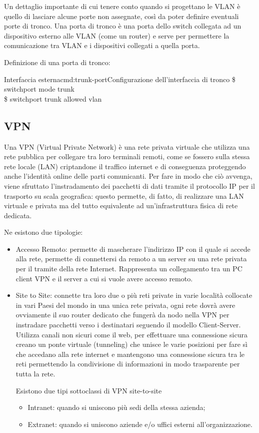 Un dettaglio importante di cui tenere conto quando si progettano le VLAN è quello di lasciare alcune porte non assegnate, così da poter definire eventuali porte di tronco. Una porta di tronco è una porta dello switch collegata ad un dispositivo esterno alle VLAN (come un router) e serve per permettere la comunicazione tra VLAN e i dispositivi collegati a quella porta.

Definizione di una porta di tronco:

\begin{cmds}[Switch]{Interfaccia esterna}{cmd:trunk-port}{Configurazione dell'interfaccia di tronco}
    \$ switchport mode trunk\\
    \$ switchport trunk allowed vlan
\end{cmds}

\subsection{VPN}
Una VPN (Virtual Private Network) è una rete privata virtuale che utilizza una rete pubblica per collegare tra loro terminali remoti, come se fossero sulla stessa rete locale (LAN) criptandone il traffico internet e di conseguenza proteggendo anche l’identità online delle parti comunicanti. Per fare in modo che ciò avvenga, viene sfruttato l’instradamento dei pacchetti di dati tramite il protocollo IP per il trasporto su scala geografica: questo permette, di fatto, di realizzare una LAN virtuale e privata ma del tutto equivalente ad un’infrastruttura fisica di rete dedicata.

Ne esistono due tipologie:

\begin{itemize}
    \item Accesso Remoto: permette di mascherare l’indirizzo IP con il quale si accede alla rete, permette di connettersi da remoto a un server su una rete privata per il tramite della rete Internet. Rappresenta un collegamento tra un PC client VPN e il server a cui si vuole avere accesso remoto.
    \item Site to Site: connette tra loro due o più reti private in varie località collocate in vari Paesi del mondo in una unica rete privata, ogni rete dovrà avere ovviamente il suo router dedicato che fungerà da nodo nella VPN per instradare pacchetti verso i destinatari seguendo il modello Client-Server. Utilizza canali non sicuri come il web, per effettuare una connessione sicura creano un ponte virtuale (tunneling) che unisce le varie posizioni per fare sì che accedano alla rete internet e mantengono una connessione sicura tra le reti permettendo la condivisione di informazioni in modo trasparente per tutta la rete.
    
    Esistono due tipi sottoclassi di VPN site-to-site

    \begin{itemize}
            \item Intranet: quando si uniscono più sedi della stessa azienda; 
            \item Extranet: quando si uniscono aziende e/o uffici esterni all’organizzazione.
    \end{itemize}
\end{itemize}


